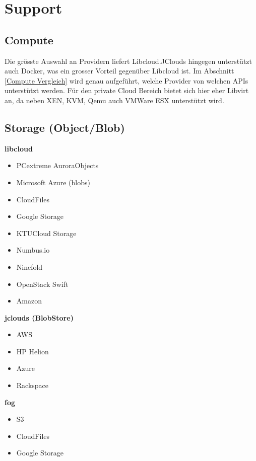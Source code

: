 \section{Support}
\subsection{Compute}
Die grösste Auswahl an Providern liefert Libcloud.JClouds hingegen 
unterstützt auch Docker, was ein grosser Vorteil gegenüber Libcloud ist. Im 
Abschnitt \ref{Compute Vergleich} wird genau aufgeführt, 
welche Provider von welchen APIs unterstützt werden.
Für den private Cloud Bereich bietet sich hier eher Libvirt an, da neben XEN, 
KVM, Qemu auch VMWare ESX unterstützt wird.

\subsection{Storage (Object/Blob)}
\textbf{libcloud}
\begin{multicols}{2}
\begin{itemize}
\item PCextreme AuroraObjects
\item Microsoft Azure (blobs)
\item CloudFiles
\item Google Storage
\item KTUCloud Storage
\item Numbus.io
\item Ninefold
\item OpenStack Swift
\item Amazon
\end{itemize}
\end{multicols}
\newpage
\textbf{jclouds (BlobStore)}
\begin{multicols}{2}
\begin{itemize}
\item AWS
\item HP Helion
\item Azure
\item Rackspace
\end{itemize}
\end{multicols}

\textbf{fog}
\begin{multicols}{2}
\begin{itemize}
\item S3
\item CloudFiles
\item Google Storage
\end{itemize}
\end{multicols}

